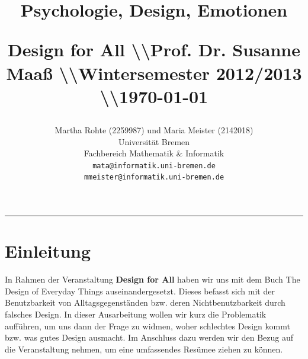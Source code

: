 \documentclass[parskip,headsepline, headtopline, %
footsepline, oneside, 12pt, headings=small]{scrreprt}
\title{ \fontsize{50}{60}\selectfont \vspace{2.10cm}
\hfill \begin{huge}{\fontfamily{@arialn}\selectfont {\fontfamily{txtt}\selectfont The Design for All}}\end{huge}
 \hfill \large{\begin{flushright}Psychologie, Design, Emotionen\end{flushright}} \vspace{1.9cm}
 \hfill \small{Design for All \textbackslash\textbackslash Prof. Dr. Susanne Maaß \textbackslash\textbackslash  Wintersemester 2012/2013 \textbackslash\textbackslash  \today} 
}
\author{
                \hfill Martha Rohte (2259987) und Maria Meister (2142018)\\  
                \hfill Universität Bremen\\   
                \hfill Fachbereich Mathematik \& Informatik \\
        \hfill \texttt{\fontfamily{cmr}\selectfont mata@informatik.uni-bremen.de} \\
        \hfill \texttt{\fontfamily{cmr}\selectfont mmeister@informatik.uni-bremen.de} \\
}
\makeatletter
\newcommand{\HRule}[1]{\hfill \rule{0.2\linewidth}{#1}}         %
\def\printtitle{%
    {\centering \@title\par}}
\def\printauthor{%
    {\centering \large \@author}}
\makeatother
\begin{document}
\thispagestyle{empty}                           %



\colorbox{grey}{
        \parbox[t]{1.14\linewidth}{
                \printtitle 
                \vspace*{0.2cm}               
        }
}
        \vfill
\printauthor                                                            %
\HRule{1pt}

\clearpage




\tableofcontents
 \clearpage

\chapter*{Einleitung}


In Rahmen der Veranstaltung \textbf{Design for All} haben wir uns mit dem Buch The Design of Everyday Things auseinandergesetzt. Dieses befasst sich mit der  Benutzbarkeit von Alltagsgegenständen bzw. deren Nichtbenutzbarkeit durch falsches Design. In dieser Ausarbeitung wollen wir kurz die Problematik aufführen, um uns dann der Frage zu widmen, woher schlechtes Design kommt bzw. was gutes Design ausmacht. Im Anschluss dazu werden wir den Bezug auf die Veranstaltung nehmen, um eine umfassendes Resümee ziehen zu können.
\end{document}
